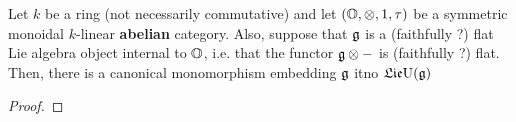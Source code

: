                     \begin{lemma}
                        Let $k$ be a ring (not necessarily commutative) and let $(\O, \tensor, 1, \tau)$ be a symmetric monoidal $k$-linear \textbf{abelian} category. Also, suppose that $\mathfrak{g}$ is a (faithfully ?) flat Lie algebra object internal to $\mathbb{O}$, i.e. that the functor $\g \tensor -$ is (faithfully ?) flat. Then, there is a canonical monomorphism embedding $\mathfrak{g}$ itno $\mathfrak{Lie} \mathrm{U}(\mathfrak{g})$
                    \end{lemma}
                        \begin{proof}
                        \end{proof}
                    
